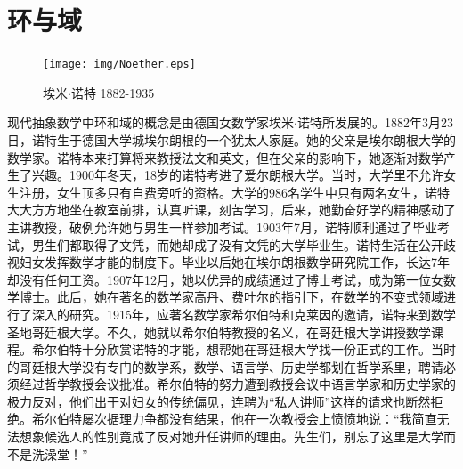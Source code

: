 \documentclass{article}
\begin{document}
\begin{Exercise}
\end{Exercise}

\section{环与域}

\begin{figure}
 \centering
 \texttt{[image: img/Noether.eps]}
 \captionsetup{labelformat=empty}
 \caption{埃米$\cdot$诺特 1882-1935}
 \label{fig:Noether}
\end{figure}

现代抽象数学中环和域的概念是由德国女数学家埃米$\cdot$诺特所发展的。1882年3月23日，诺特生于德国大学城埃尔朗根的一个犹太人家庭。她的父亲是埃尔朗根大学的数学家。诺特本来打算将来教授法文和英文，但在父亲的影响下，她逐渐对数学产生了兴趣。1900年冬天，18岁的诺特考进了爱尔朗根大学。当时，大学里不允许女生注册，女生顶多只有自费旁听的资格。大学的986名学生中只有两名女生，诺特大大方方地坐在教室前排，认真听课，刻苦学习，后来，她勤奋好学的精神感动了主讲教授，破例允许她与男生一样参加考试。1903年7月，诺特顺利通过了毕业考试，男生们都取得了文凭，而她却成了没有文凭的大学毕业生。诺特生活在公开歧视妇女发挥数学才能的制度下。毕业以后她在埃尔朗根数学研究院工作，长达7年却没有任何工资。1907年12月，她以优异的成绩通过了博士考试，成为第一位女数学博士。此后，她在著名的数学家高丹、费叶尔的指引下，在数学的不变式领域进行了深入的研究。1915年，应著名数学家希尔伯特和克莱因的邀请，诺特来到数学圣地哥廷根大学。不久，她就以希尔伯特教授的名义，在哥廷根大学讲授数学课程。希尔伯特十分欣赏诺特的才能，想帮她在哥廷根大学找一份正式的工作。当时的哥廷根大学没有专门的数学系，数学、语言学、历史学都划在哲学系里，聘请必须经过哲学教授会议批准。希尔伯特的努力遭到教授会议中语言学家和历史学家的极力反对，他们出于对妇女的传统偏见，连聘为“私人讲师”这样的请求也断然拒绝。希尔伯特屡次据理力争都没有结果，他在一次教授会上愤愤地说：“我简直无法想象候选人的性别竟成了反对她升任讲师的理由。先生们，别忘了这里是大学而不是洗澡堂！”
\end{document}
